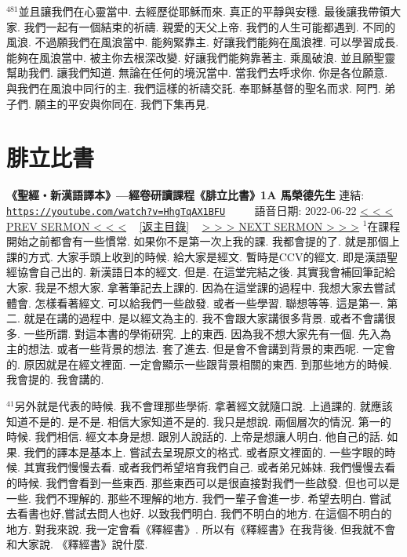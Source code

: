 \documentclass{book}
\begin{document}
$^{481}$並且讓我們在心靈當中.
去經歷從耶穌而來.
真正的平靜與安穩.
最後讓我帶領大家.
我們一起有一個結束的祈禱.
親愛的天父上帝.
我們的人生可能都遇到.
不同的風浪.
不過願我們在風浪當中.
能夠緊靠主.
好讓我們能夠在風浪裡.
可以學習成長.
能夠在風浪當中.
被主你去根深改變.
好讓我們能夠靠著主.
乘風破浪.
並且願聖靈幫助我們.
讓我們知道.
無論在任何的境況當中.
當我們去呼求你.
你是各位願意.
與我們在風浪中同行的主.
我們這樣的祈禱交託.
奉耶穌基督的聖名而求.
阿門.
弟子們.
願主的平安與你同在.
我們下集再見.
\newpage



\section{腓立比書}
\label{sec:HhgTqAX1BFU}
\textbf{《聖經‧新漢語譯本》—經卷研讀課程《腓立比書》1A 馬榮德先生}
\newline
\newline
連結: \href{https://youtube.com/watch?v=HhgTqAX1BFU}{\texttt{https://youtube.com/watch?v=HhgTqAX1BFU}} ~~~~ 語音日期: 2022-06-22
\newline
\newline
\hyperref[sec:GZC4IF6Mp8U]{\small{< < < PREV SERMON < < <}}
~
\hyperref[sec:index]{\small{[返主目錄]}}
~
\hyperref[sec:io2zo_oCeFk]{\small{> > > NEXT SERMON > > >}}
\newline
\newline
$^{1}$在課程開始之前都會有一些慣常.
如果你不是第一次上我的課.
我都會提的了.
就是那個上課的方式.
大家手頭上收到的時候.
給大家是經文.
暫時是CCV的經文.
即是漢語聖經協會自己出的.
新漢語日本的經文.
但是.
在這堂完結之後.
其實我會補回筆記給大家.
我是不想大家.
拿著筆記去上課的.
因為在這堂課的過程中.
我想大家去嘗試體會.
怎樣看著經文.
可以給我們一些啟發.
或者一些學習.
聯想等等.
這是第一.
第二.
就是在講的過程中.
是以經文為主的.
我不會跟大家講很多背景.
或者不會講很多.
一些所謂.
對這本書的學術研究.
上的東西.
因為我不想大家先有一個.
先入為主的想法.
或者一些背景的想法.
套了進去.
但是會不會講到背景的東西呢.
一定會的.
原因就是在經文裡面.
一定會顯示一些跟背景相關的東西.
到那些地方的時候.
我會提的.
我會講的.

$^{41}$另外就是代表的時候.
我不會理那些學術.
拿著經文就隨口說.
上過課的.
就應該知道不是的.
是不是.
相信大家知道不是的.
我只是想說.
兩個層次的情況.
第一的時候.
我們相信.
經文本身是想.
跟別人說話的.
上帝是想讓人明白.
他自己的話.
如果.
我們的譯本是基本上.
嘗試去呈現原文的格式.
或者原文裡面的.
一些字眼的時候.
其實我們慢慢去看.
或者我們希望培育我們自己.
或者弟兄姊妹.
我們慢慢去看的時候.
我們會看到一些東西.
那些東西可以是很直接對我們一些啟發.
但也可以是一些.
我們不理解的.
那些不理解的地方.
我們一輩子會進一步.
希望去明白.
嘗試去看書也好,嘗試去問人也好.
以致我們明白.
我們不明白的地方.
在這個不明白的地方.
對我來說.
我一定會看《釋經書》.
所以有《釋經書》在我背後.
但我就不會和大家說.
《釋經書》說什麼.
\end{document}
